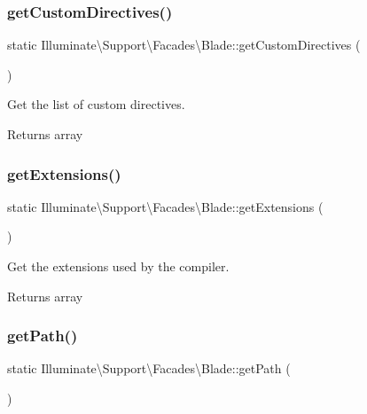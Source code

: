 \subsubsection{\texorpdfstring{get\+Custom\+Directives()}{getCustomDirectives()}}
{\footnotesize\ttfamily static Illuminate\textbackslash{}\+Support\textbackslash{}\+Facades\textbackslash{}\+Blade\+::get\+Custom\+Directives (\begin{DoxyParamCaption}{ }\end{DoxyParamCaption})\hspace{0.3cm}{\ttfamily [static]}}

Get the list of custom directives.

\begin{DoxyReturn}{Returns}
array 
\end{DoxyReturn}
\mbox{\label{class_illuminate_1_1_support_1_1_facades_1_1_blade_ac5cb8f56b82091732182cd9bd2b84280}} 
\subsubsection{\texorpdfstring{get\+Extensions()}{getExtensions()}}
{\footnotesize\ttfamily static Illuminate\textbackslash{}\+Support\textbackslash{}\+Facades\textbackslash{}\+Blade\+::get\+Extensions (\begin{DoxyParamCaption}{ }\end{DoxyParamCaption})\hspace{0.3cm}{\ttfamily [static]}}

Get the extensions used by the compiler.

\begin{DoxyReturn}{Returns}
array 
\end{DoxyReturn}
\mbox{\label{class_illuminate_1_1_support_1_1_facades_1_1_blade_af4cd0ba1505bbd09031711afe52adfca}} 
\subsubsection{\texorpdfstring{get\+Path()}{getPath()}}
{\footnotesize\ttfamily static Illuminate\textbackslash{}\+Support\textbackslash{}\+Facades\textbackslash{}\+Blade\+::get\+Path (\begin{DoxyParamCaption}{ }\end{DoxyParamCaption})\hspace{0.3cm}{\ttfamily [static]}}

